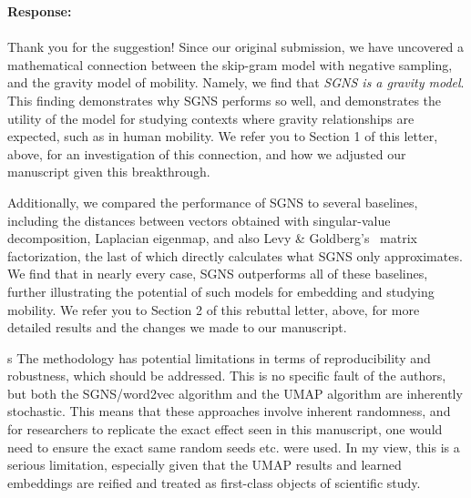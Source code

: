\documentclass[12pt,a4paper]{article}
\newcommand{\response}[1]{{\noindent \textbf{Response:} \\ \\ \noindent #1}}
\newcommand{\rcomment}[1]{%
\vspace{10pt}
\begin{sectionbox}
s #1
\end{sectionbox}
}
\begin{document}
\response{
	Thank you for the suggestion!
	Since our original submission, we have uncovered a mathematical connection between the skip-gram model with negative sampling, and the gravity model of mobility.
	Namely, we find that \emph{SGNS is a gravity model}.
	This finding demonstrates why SGNS performs so well, and demonstrates the utility of the model for studying contexts where gravity relationships are expected, such as in human mobility.
	We refer you to Section 1 of this letter, above, for an investigation of this connection, and how we adjusted our manuscript given this breakthrough.

	Additionally, we compared the performance of SGNS to several baselines, including the distances between vectors obtained with singular-value decomposition, Laplacian eigenmap, and also Levy
	\& Goldberg's~\autocite{levy2014neural} matrix factorization, the last of which directly calculates what SGNS only approximates.
	We find that in nearly every case, SGNS outperforms all of these baselines, further illustrating the potential of such models for embedding and studying mobility.
	We refer you to Section 2 of this rebuttal letter, above, for more detailed results and the changes we made to our manuscript.
}



\rcomment{%
	The methodology has potential limitations in terms of reproducibility and robustness, which should be addressed. This is no specific fault of the authors, but both the SGNS/word2vec algorithm and the UMAP algorithm are inherently stochastic. This means that these approaches involve inherent randomness, and for researchers to replicate the exact effect seen in this manuscript, one would need to ensure the exact same random seeds etc. were used. In my view, this is a serious limitation, especially given that the UMAP results and learned embeddings are reified and treated as first-class objects of scientific study.
}
\end{document}
